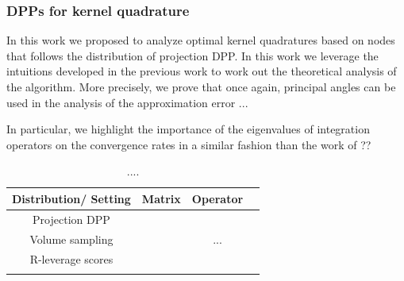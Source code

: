 \documentclass[twoside,11pt]{book}
\newtheorem{theorem}{Theorem}
\numberwithin{theorem}{chapter}
\numberwithin{definition}{chapter}
\numberwithin{proposition}{chapter}
\numberwithin{corollary}{chapter}
\numberwithin{example}{chapter}
\numberwithin{lemma}{chapter}
\DeclareMathOperator{\Det}{Det}
\DeclareMathOperator{\Fr}{\mathrm{Fr}}
\DeclareMathOperator{\VS}{\mathrm{VS}}
\DeclareMathOperator{\Tran}{\intercal}
\DeclareMathOperator{\EX}{\mathbb{E}}
\DeclareMathOperator{\Prb}{\mathbb{P}}
\begin{document}


\subsubsection{DPPs for kernel quadrature}

In this work we proposed to analyze optimal kernel quadratures based on nodes that follows the distribution of projection DPP. 
In this work we leverage the intuitions developed in the previous work to work out the theoretical analysis of the algorithm. More precisely, we prove that once again, principal angles can be used in the analysis of the approximation error ...

In particular, we highlight the importance of the eigenvalues of integration operators on the convergence rates in a similar fashion than the work of ??



\begin{table}
\centering
 \begin{tabular}{| c| c| c| c|}
 \hline
  Distribution/ Setting & Matrix & Operator\\
 \hline
 Projection DPP& \cite{BeBaCh18} & \cite{BeBaCh19} \\
 \hline
 Volume sampling& \cite{DRVW06} & ... \\
 \hline
 R-leverage scores & \cite{Bac13}  & \cite{Bac17}  \\
 &  \cite{AlMa15} &   \\
\hline
\end{tabular}
\caption{....\label{table:matrix_operator_duality}}
\end{table}
\end{document}
